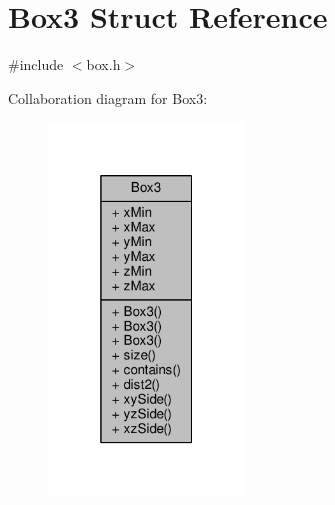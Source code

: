\hypertarget{structBox3}{}\section{Box3 Struct Reference}
\label{structBox3}


{\ttfamily \#include $<$box.\+h$>$}



Collaboration diagram for Box3\+:\nopagebreak
\begin{figure}[H]
\begin{center}
\leavevmode
\includegraphics[width=148pt]{structBox3__coll__graph}
\end{center}
\end{figure}
